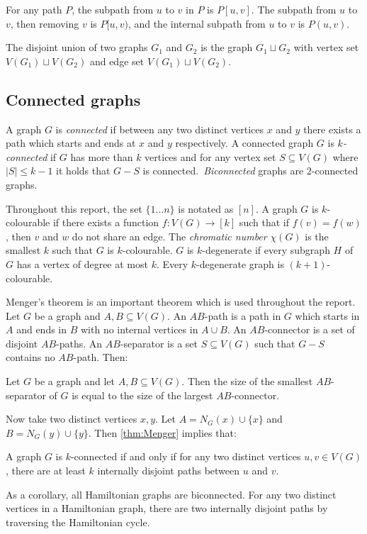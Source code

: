 For any path $P$, the subpath from $u$ to $v$ in $P$ is $P[u, v]$. The subpath from $u$ to $v$, then removing $v$ is $P[u, v)$, and the internal subpath from $u$ to $v$ is $P(u, v)$. 

The disjoint union of two graphs $G_1$ and $G_2$ is the graph $G_1 \sqcup G_2$ with vertex set $V(G_1) \sqcup V(G_2)$ and edge set $V(G_1) \sqcup V(G_2)$. 

\subsection{Connected graphs}
A graph $G$ is \textit{connected} if between any two distinct vertices $x$ and $y$ there exists a path which starts and ends at $x$ and $y$ respectively. 
A connected graph \(G\) is \textit{\(k\)-connected} if \(G\) has more than \(k\) vertices and for any vertex set $S \subseteq V(G)$ where $|S| \leq k - 1$ it holds that $G - S$ is connected.\ \textit{Biconnected} graphs are $2$-connected graphs. 

Throughout this report, the set $\lbrace 1\ldots n \rbrace$ is notated as $[n]$. 
A graph \(G\) is \(k\)-colourable if there exists a function \(f: V(G) \rightarrow [k]\) such that if $f(v) = f(w)$, then $v$ and $w$ do not share an edge. The \textit{chromatic number} \(\chi(G)\) is the smallest \(k\) such that \(G\) is \(k\)-colourable.
$G$ is $k$-degenerate if every subgraph $H$ of $G$ has a vertex of degree at most $k$. Every $k$-degenerate graph is $(k + 1)$-colourable. 

Menger's theorem \cite{mengerZurAllgemeinenKurventheorie1927} is an important theorem which is used throughout the report.
Let \(G\) be a graph and \(A, B \subseteq V(G)\). An \(AB\)-path is a path in \(G\) which starts in \(A\) and ends in \(B\) with no internal vertices in \(A \cup B\). An \(AB\)-connector is a set of disjoint \(AB\)-paths. An \(AB\)-separator is a set \(S \subseteq V(G)\) such that \(G - S\) contains no \(AB\)-path. Then:
\begin{theorem}\label{thm:Menger}
	Let $G$ be a graph and let $A, B \subseteq V(G)$. Then the size of the smallest \(AB\)-separator of \(G\) is equal to the size of the largest \(AB\)-connector.
\end{theorem}
Now take two distinct vertices \(x, y\). Let \(A = N_G(x) \cup \{x\} \) and \(B = N_G(y) \cup \{y\} \). Then \cref{thm:Menger} implies that:
\begin{theorem}\label{thm:Menger_Vertex}
	A graph \(G\) is \(k\)-connected if and only if for any two distinct vertices $u,v \in V(G)$, there are at least \(k\) internally disjoint paths between $u$ and $v$.
\end{theorem}
As a corollary, all Hamiltonian graphs are biconnected. For any two distinct vertices in a Hamiltonian graph, there are two internally disjoint paths by traversing the Hamiltonian cycle.
